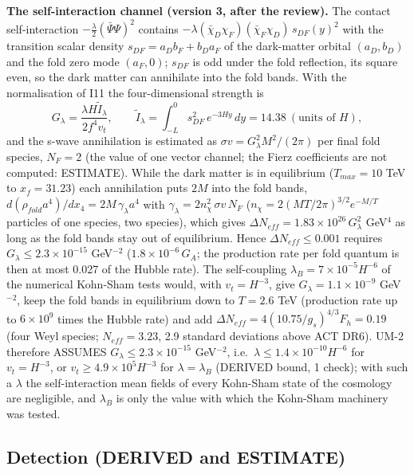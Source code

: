 \documentclass[
  10pt,
]{article}
\begin{document}
\textbf{The self-interaction channel (version 3, after the review).} The
contact self-interaction \(-\frac{\lambda}{2}(\bar\Psi\Psi)^2\) contains
\(-\lambda(\bar\chi_D\chi_F)(\bar\chi_F\chi_D)\,s_{DF}(y)^2\) with the
transition scalar density \(s_{DF} = a_Db_F + b_Da_F\) of the
dark-matter orbital \((a_D, b_D)\) and the fold zero mode \((a_F, 0)\);
\(s_{DF}\) is odd under the fold reflection, its square even, so the
dark matter can annihilate into the fold bands. With the normalisation
of I11 the four-dimensional strength is
\[ G_\lambda = \frac{\lambda H\tilde I_\lambda}{2f^4v_t},\qquad \tilde I_\lambda = \int_{-L}^{0}s_{DF}^2\,e^{-3Hy}\,dy = 14.38\ (\text{units of }H), \]
and the s-wave annihilation is estimated as
\(\sigma v = G_\lambda^2M^2/(2\pi)\) per final fold species, \(N_F = 2\)
(the value of one vector channel; the Fierz coefficients are not
computed: ESTIMATE). While the dark matter is in equilibrium
(\(T_{max} = 10\) TeV to \(x_f = 31.23\)) each annihilation puts \(2M\)
into the fold bands, \(d(\rho_{fold}a^4)/dx_4 = 2M\,\gamma_\lambda a^4\)
with \(\gamma_\lambda = 2n_\chi^2\,\sigma v\,N_F\)
(\(n_\chi = 2(MT/2\pi)^{3/2}e^{-M/T}\) particles of one species, two
species), which gives
\(\Delta N_{eff} = 1.83\times10^{26}\,G_\lambda^2\) GeV\(^4\) as long as
the fold bands stay out of equilibrium. Hence
\(\Delta N_{eff} \le 0.001\) requires
\(G_\lambda \le 2.3\times10^{-15}\) GeV\(^{-2}\)
(\(1.8\times10^{-6}\,G_A\); the production rate per fold quantum is then
at most 0.027 of the Hubble rate). The self-coupling
\(\lambda_B = 7\times10^{-5}H^{-6}\) of the numerical Kohn-Sham tests
would, with \(v_t = H^{-3}\), give \(G_\lambda = 1.1\times10^{-9}\)
GeV\(^{-2}\), keep the fold bands in equilibrium down to \(T = 2.6\) TeV
(production rate up to \(6\times10^9\) times the Hubble rate) and add
\(\Delta N_{eff} = 4(10.75/g_s)^{4/3}F_h = 0.19\) (four Weyl species;
\(N_{eff} = 3.23\), 2.9 standard deviations above ACT DR6). UM-2
therefore ASSUMES \(G_\lambda \le 2.3\times10^{-15}\) GeV\(^{-2}\),
i.e.~\(\lambda \le 1.4\times10^{-10}H^{-6}\) for \(v_t = H^{-3}\), or
\(v_t \ge 4.9\times10^5H^{-3}\) for \(\lambda = \lambda_B\) (DERIVED
bound, 1 check); with such a \(\lambda\) the self-interaction mean
fields of every Kohn-Sham state of the cosmology are negligible, and
\(\lambda_B\) is only the value with which the Kohn-Sham machinery was
tested.

\hypertarget{detection-derived-and-estimate}{%
\subsection{Detection (DERIVED and
ESTIMATE)}\label{detection-derived-and-estimate}}
\end{document}
